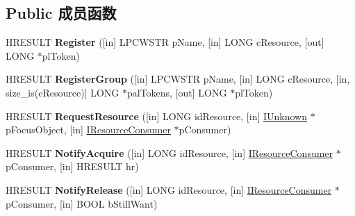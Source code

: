 \subsection*{Public 成员函数}
\begin{DoxyCompactItemize}
\item 
\mbox{\label{interface_i_resource_manager_ad751acd319d90199554cdd06b3e3445a}} 
H\+R\+E\+S\+U\+LT {\bfseries Register} (\mbox{[}in\mbox{]} L\+P\+C\+W\+S\+TR p\+Name, \mbox{[}in\mbox{]} L\+O\+NG c\+Resource, \mbox{[}out\mbox{]} L\+O\+NG $\ast$pl\+Token)
\item 
\mbox{\label{interface_i_resource_manager_aa58d75ce2ad743837de77471cf4c5343}} 
H\+R\+E\+S\+U\+LT {\bfseries Register\+Group} (\mbox{[}in\mbox{]} L\+P\+C\+W\+S\+TR p\+Name, \mbox{[}in\mbox{]} L\+O\+NG c\+Resource, \mbox{[}in, size\+\_\+is(c\+Resource)\mbox{]} L\+O\+NG $\ast$pal\+Tokens, \mbox{[}out\mbox{]} L\+O\+NG $\ast$pl\+Token)
\item 
\mbox{\label{interface_i_resource_manager_acb0a5e5cea9778dde6f90d9777e2c2ac}} 
H\+R\+E\+S\+U\+LT {\bfseries Request\+Resource} (\mbox{[}in\mbox{]} L\+O\+NG id\+Resource, \mbox{[}in\mbox{]} \hyperlink{interface_i_unknown}{I\+Unknown} $\ast$p\+Focus\+Object, \mbox{[}in\mbox{]} \hyperlink{interface_i_resource_consumer}{I\+Resource\+Consumer} $\ast$p\+Consumer)
\item 
\mbox{\label{interface_i_resource_manager_a96881d7df0bc6f99af735631d484d792}} 
H\+R\+E\+S\+U\+LT {\bfseries Notify\+Acquire} (\mbox{[}in\mbox{]} L\+O\+NG id\+Resource, \mbox{[}in\mbox{]} \hyperlink{interface_i_resource_consumer}{I\+Resource\+Consumer} $\ast$p\+Consumer, \mbox{[}in\mbox{]} H\+R\+E\+S\+U\+LT hr)
\item 
\mbox{\label{interface_i_resource_manager_abe85391e826259d747d92030d47ef58d}} 
H\+R\+E\+S\+U\+LT {\bfseries Notify\+Release} (\mbox{[}in\mbox{]} L\+O\+NG id\+Resource, \mbox{[}in\mbox{]} \hyperlink{interface_i_resource_consumer}{I\+Resource\+Consumer} $\ast$p\+Consumer, \mbox{[}in\mbox{]} B\+O\+OL b\+Still\+Want)
\item 
\mbox{\label{interface_i_resource_manager_a957f147fb38a9cdb758b26ad222837b4}} 

\end{DoxyCompactItemize}
